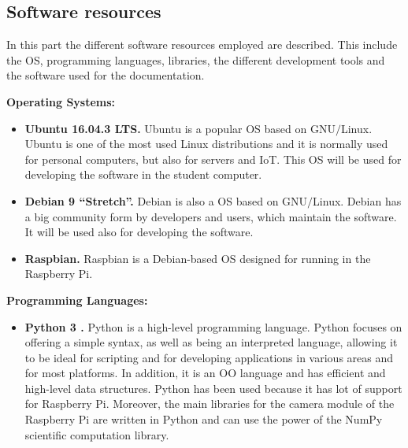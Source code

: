 \subsection{Software resources}
In this part the different software resources employed are described. This include the \ac{OS}, programming languages, libraries, the different development tools and the software used for the documentation.


\textbf{Operating Systems:}
\begin{itemize}
	\item \textbf{Ubuntu 16.04.3 LTS.} Ubuntu is a popular \ac{OS} based on \ac{GNU}$/$Linux. Ubuntu is one of the most used Linux distributions and it is normally used for personal computers, but also for servers and \ac{IoT}. This \ac{OS} will be used for developing the software in the student computer.
	
	\item \textbf{Debian 9 “Stretch”.} Debian is also a \ac{OS} based on \ac{GNU}$/$Linux. Debian has a big community form by developers and users, which maintain the software. It will be used also for developing the software.
	
	\item \textbf{Raspbian.} Raspbian is a Debian-based \ac{OS} designed for running in the Raspberry Pi.
	
	
\end{itemize}

\textbf{Programming Languages:}
\begin{itemize}
	\item \textbf{Python 3 \cite{Dow12}.} Python is a high-level programming language. Python focuses on offering a simple syntax, as well as being an interpreted language, allowing it to be ideal for scripting and for developing applications in various areas and for most platforms. In addition, it is an \ac{OO} language and has efficient and high-level data structures. Python has been used because it has lot of support for Raspberry Pi. Moreover, the main libraries for the camera module of the Raspberry Pi are written in Python and can use the power of the NumPy scientific computation library.
	
\end{itemize}

